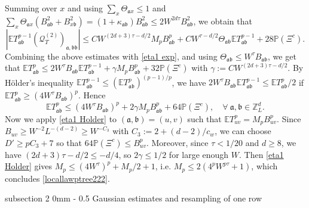 \documentclass{article}
\makeatletter
\newcommand{\1}{\mathds{1}}
\numberwithin{equation}{section}
\newcommand{\be}{\begin{equation}}
\newcommand{\ee}{\end{equation}}
\newcommand{\fa}{{\mathfrak a}}
\newcommand{\fb}{{\mathfrak b}}
\renewcommand{\leq}{\leqslant}
\renewcommand{\geq}{\geqslant}
\renewcommand{\le}{\leq}
\renewcommand{\ge}{\geq}
\renewcommand{\P}{\mathbb{P}}
\newcommand{\E}{\mathbb{E}}
\newcommand{\Z}{\mathbb{Z}}
\theoremstyle{plain} %
\theoremstyle{remark}
\newcommand{\QT}{\mathcal Q_T}
\renewcommand{\subsection}{\@startsection
	{subsection}%
	{2}%
	{0mm}%
	{-\baselineskip}%
	{0.5\baselineskip}%
	{\normalfont\bf\itshape}} %
\makeatother
\begin{document}
Summing over $x$ and using $\sum_x\Theta_{\fa x}\le 1$ and $\sum_x\Theta_{\fa x}(B_{\fa\fb}^2+B_{x\fb}^2)= (1+\kappa_{\fa\fb})B_{\fa\fb}^2\le 2W^{2d\tau}B_{\fa\fb}^2$, we obtain that
\be\label{eta1 Q}
\left|\E T_{\fa\fb}^{p-1}(\QT^{(2)})_{\fa,\fb\fb}\right| \le CW^{(2d+3)\tau-d/2}M_pB_{\fa\fb}^p+CW^{\tau-d/2}\Theta_{\fa\fb}\E T_{\fa\fb}^{p-1}+28\P(\Xi^c).
\ee
Combining the above estimates with \eqref{eta1 exp}, and using $\Theta_{\fa\fb}\le W^\tau B_{\fa\fb}$, we get that $\E T_{\fa\fb}^p\le 2W^\tau B_{\fa\fb}\E T_{\fa\fb}^{p-1}+\gamma M_pB_{\fa\fb}^p+32\P(\Xi^c)$ with $\gamma:=CW^{(2d+3)\tau-d/2}$. By H\"older's inequality $\E T_{\fa\fb}^{p-1}\le (\E T_{\fa\fb}^p)^{(p-1)/p}$, we have $2W^\tau B_{\fa\fb}\E T_{\fa\fb}^{p-1}\le \E T_{\fa\fb}^p/2$ if $\E T_{\fa\fb}^p\ge (4W^\tau B_{\fa\fb})^p$. Hence
\be\label{eta1 Holder}
\E T_{\fa\fb}^p\le (4W^\tau B_{\fa\fb})^p+2\gamma M_pB_{\fa\fb}^p+64\P(\Xi^c),\quad \forall\ \fa,\fb\in \Z_L^d .
\ee
Now we apply \eqref{eta1 Holder} to $(\fa,\fb)=(u,v)$ such that $\E T_{uv}^p=M_pB_{uv}^p$. Since $B_{uv}\ge W^{-2}L^{-(d-2)}\ge W^{-C_3}$ with $C_3:=2+(d-2)/c_w$, we can choose $D'\ge pC_3+7$ so that $64\P(\Xi^c)\le B_{uv}^p$. Moreover, since $\tau<1/20$ and $d\ge 8$, we have $(2d+3)\tau-d/2\le -d/4$, so $2\gamma\le 1/2$ for large enough $W$. Then \eqref{eta1 Holder} gives $M_p\le (4W^\tau)^p+M_p/2+1$, i.e. $M_p\le 2(4^pW^{p\tau}+1)$, which concludes \eqref{locallawptree222}. 


\subsection{Gaussian estimates and resampling of one row}\label{sec resample}
\end{document}
